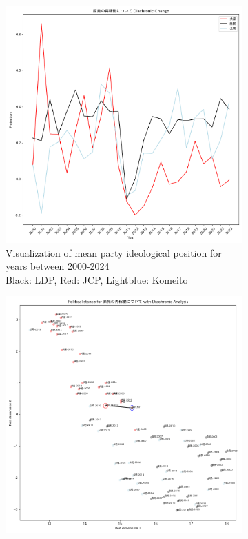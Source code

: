 \documentclass[final,5p,times,twocolumn,authoryear]{elsarticle}
\begin{document}
\begin{figure}[h]
	\centering
		\begin{subfigure}{0.48\textwidth}
		  \centering
		  \includegraphics[width=\textwidth]{figs/results/diachronic_nuclear/原発の再稼働について_原発_diachronic_change.png}
		  \caption{Visualization of mean party ideological position for years between 2000-2024 \\\hspace{\textwidth}  Black: LDP, Red: JCP, Lightblue: Komeito}
		  \label{fig:sub1}
		\end{subfigure}
		\hfill
		\begin{subfigure}{0.48\textwidth}
		  \centering
		  \includegraphics[width=\textwidth]{figs/results/diachronic_nuclear/原発の再稼働について_diachronic_umap.png}

\end{subfigure}
\end{figure}
\end{document}

